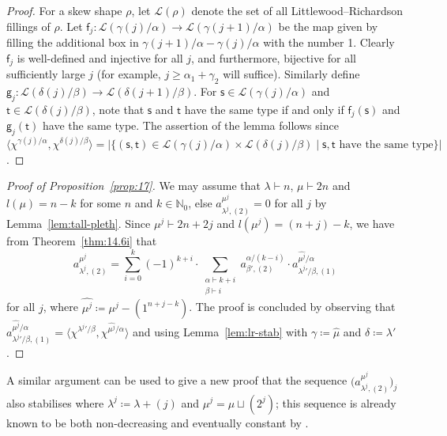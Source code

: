 \documentclass[ALCO, Unicode]{cedram}
\newcommand{\cL}{\mathcal{L}}
\newcommand{\ff}{\mathsf{f}}
\newcommand{\fg}{\mathsf{g}}
\newcommand{\N}{\mathbb{N}}
\begin{document}
\begin{proof}
	For a skew shape $\rho$, let $\cL(\rho)$ denote the set of all Littlewood--Richardson fillings of $\rho$. Let $\ff_j:\cL(\gamma(j)/\alpha)\to \cL(\gamma(j+1)/\alpha)$ be the map given by filling the additional box in $\gamma(j+1)/\alpha - \gamma(j)/\alpha$ with the number 1. Clearly $\ff_j$ is well-defined and injective for all $j$, and furthermore, bijective for all sufficiently large $j$ (for example, $j\ge \alpha_1+\gamma_2$ will suffice).
	Similarly define $\fg_j:\cL(\delta(j)/\beta)\to\cL(\delta(j+1)/\beta)$. For $\mathsf{s}\in\cL(\gamma(j)/\alpha)$ and $\mathsf{t}\in\cL(\delta(j)/\beta)$, note that $\mathsf{s}$ and $\mathsf{t}$ have the same type if and only if $\ff_j(\mathsf{s})$ and $\fg_j(\mathsf{t})$ have the same type. The assertion of the lemma follows since $\langle\chi^{\gamma(j)/\alpha},\chi^{\delta(j)/\beta}\rangle = |\{(\mathsf{s},\mathsf{t})\in\cL(\gamma(j)/\alpha)\times\cL(\delta(j)/\beta) \mid \mathsf{s}, \mathsf{t}\text{ have the same type} \}|$.
\end{proof}

\begin{proof}[Proof of Proposition~\ref{prop:17}]
	We may assume that $\lambda\vdash n$, $\mu\vdash 2n$ and $l(\mu)=n-k$ for some $n$ and $k\in\N_0$, else $a^{\mu^j}_{\lambda^j,(2)}=0$ for all $j$ by Lemma~\ref{lem:tall-pleth}. Since $\mu^j\vdash 2n+2j$ and $l(\mu^j)=(n+j)-k$, we have from Theorem~\ref{thm:14.6i} that
	\[ a^{\mu^j}_{\lambda^j,(2)} = \sum_{i=0}^k (-1)^{k+i}\cdot \sum_{\substack{\alpha\vdash k+i\\\beta\vdash i}} a^{\alpha/(k-i)}_{\beta',(2)}\cdot a^{\hat{\mu^j}/\alpha}_{{\lambda^j}'/\beta,(1)} \]
	for all $j$, where $\hat{\mu^j}\coloneqq \mu^j-(1^{n+j-k})$. The proof is concluded by observing that $a^{\hat{\mu^j}/\alpha}_{{\lambda^j}'/\beta,(1)}=\langle \chi^{{\lambda^j}'/\beta},\chi^{\hat{\mu^j}/\alpha}\rangle$ and using Lemma~\ref{lem:lr-stab} with $\gamma\coloneqq \hat{\mu}$ and $\delta\coloneqq \lambda'$.
\end{proof}

\begin{remark}
	A similar argument can be used to give a new proof that the sequence $\big(a^{\mu^j}_{\lambda^j,(2)}\big)_j$ also stabilises where $\lambda^j\coloneqq \lambda+(j)$ and $\mu^j=\mu\sqcup(2^j)$; this sequence is already known to be both non-decreasing and eventually constant by \cite[ Corollary 1]{Brion}.%
\end{remark}
\end{document}
